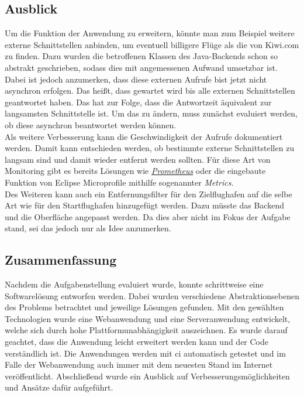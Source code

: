 \documentclass[12pt,twoside,a4paper]{article}
\begin{document}
\begin{sloppypar}
\subsection{Ausblick}
Um die Funktion der Anwendung zu erweitern, könnte man zum Beispiel weitere externe Schnittstellen anbinden, um eventuell billigere Flüge als die von Kiwi.com zu finden. Dazu wurden die betroffenen Klassen des Java-Backends schon so abstrakt geschrieben, sodass dies mit angemessenen Aufwand umsetzbar ist.\\
Dabei ist jedoch anzumerken, dass diese externen Aufrufe bist jetzt nicht asynchron erfolgen. Das heißt, dass gewartet wird bis alle externen Schnittstellen geantwortet haben. Das hat zur Folge, dass die Antwortzeit äquivalent zur langsamsten Schnittstelle ist. Um das zu ändern, muss zunächst evaluiert werden, ob diese asynchron beantwortet werden können.\\
Als weitere Verbesserung kann die Geschwindigkeit der Aufrufe dokumentiert werden. Damit kann entschieden werden, ob bestimmte externe Schnittstellen zu langsam sind und damit wieder entfernt werden sollten. Für diese Art von Monitoring gibt es bereits Lösungen wie \href{https://prometheus.io/}{\textit{Prometheus}} oder die eingebaute Funktion von Eclipse Microprofile mithilfe sogenannter \textit{Metrics}.\\
Des Weiteren kann auch ein Entfernungsfilter für den Zielflughafen auf die selbe Art wie für den Startflughafen hinzugefügt werden. Dazu müsste das Backend und die Oberfläche angepasst werden. Da dies aber nicht im Fokus der Aufgabe stand, sei das jedoch nur als Idee anzumerken.
\subsection{Zusammenfassung}
Nachdem die Aufgabenstellung evaluiert wurde, konnte schrittweise eine Softwarelösung entworfen werden. Dabei wurden verschiedene Abstraktionsebenen des Problems betrachtet und jeweilige Lösungen gefunden. Mit den gewählten Technologien wurde eine Webanwendung und eine Serveranwendung entwickelt, welche sich durch hohe Plattformunabhängigkeit auszeichnen. Es wurde darauf geachtet, dass die Anwendung leicht erweitert werden kann und der Code verständlich ist. Die Anwendungen werden mit \acrfull{ci} automatisch getestet und im Falle der Webanwendung auch immer mit dem neuesten Stand im Internet veröffentlicht. Abschließend wurde ein Ausblick auf Verbesserungsmöglichkeiten und Ansätze dafür aufgeführt.
\end{sloppypar}
\newpage


\end{document}
